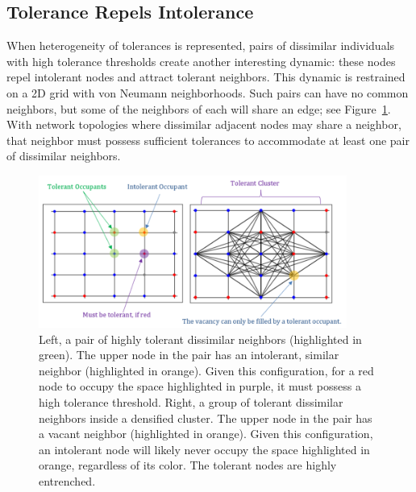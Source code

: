 \documentclass[a4paper]{article}
\begin{document}
\subsection{Tolerance Repels Intolerance}
When heterogeneity of tolerances is represented, pairs of dissimilar individuals with high tolerance thresholds create another interesting dynamic: these nodes repel intolerant nodes and attract tolerant neighbors. This dynamic is restrained on a 2D grid with von Neumann neighborhoods. Such pairs can have no common neighbors, but some of the neighbors of each will share an edge; see Figure~\ref*{fig:fig7}. With network topologies where dissimilar adjacent nodes may share a neighbor, that neighbor must possess sufficient tolerances to accommodate at least one pair of dissimilar neighbors.

\begin{figure}[H]
    \centering
    \includegraphics[width=0.9\textwidth]{fig7.png}
    \caption{Left, a pair of highly tolerant dissimilar neighbors (highlighted in green). The upper node in the pair has an intolerant, similar neighbor (highlighted in orange). Given this configuration, for a red node to occupy the space highlighted in purple, it must possess a high tolerance threshold. Right, a group of tolerant dissimilar neighbors inside a densified cluster. The upper node in the pair has a vacant neighbor (highlighted in orange). Given this configuration, an intolerant node will likely never occupy the space highlighted in orange, regardless of its color. The tolerant nodes are highly entrenched.}
    \label{fig:fig7}
\end{figure}
\end{document}
